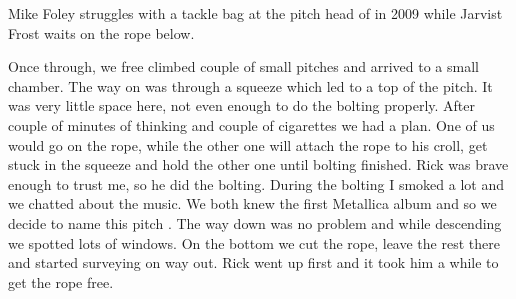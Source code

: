 \begin{marginfigure}
\checkoddpage \ifoddpage \forcerectofloat \else \forceversofloat \fi
\centering
 \caption{Mike Foley struggles with a tackle bag at the pitch head of \protect{} in 2009 while Jarvist Frost waits on the rope below. }
 \label{Kill em All Mike}
\end{marginfigure}

Once through, we free climbed couple of small pitches and arrived to a
small chamber. The way on was through a squeeze which led to a top of
the pitch. It was very little space here, not even enough to do the
bolting properly. After couple of minutes of thinking and couple of
cigarettes we had a plan. One of us would go on the rope, while the
other one will attach the rope to his croll, get stuck in the squeeze
and hold the other one until bolting finished. Rick was brave enough to
trust me, so he did the bolting. During the bolting I smoked a lot and
we chatted about the music. We both knew the first Metallica album and
so we decide to name this pitch . The way down was no
problem and while descending we spotted lots of windows. On the bottom
we cut the rope, leave the rest there and started surveying on way out.
Rick went up first and it took him a while to get the rope free. 


